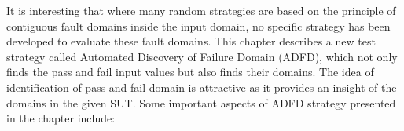 






It is interesting that where many random strategies are based on the principle of contiguous fault domains inside the input domain, no specific strategy has been developed to evaluate these fault domains. This chapter describes a new test strategy called Automated Discovery of Failure Domain (ADFD), which not only finds the pass and fail input values but also finds their domains. The idea of identification of pass and fail domain is attractive as it provides an insight of the domains in the given SUT. Some important aspects of ADFD strategy presented in the chapter include:

